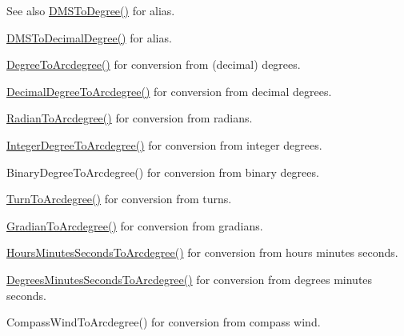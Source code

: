 \begin{DoxySeeAlso}{See also}
\mbox{\hyperlink{group___e_g_x_math-_angle_conversions-_d_m_s_ga3744d5ef737f693a191efc151d8ef3f3}{D\+M\+S\+To\+Degree()}} for alias. 

\mbox{\hyperlink{group___e_g_x_math-_angle_conversions-_d_m_s_ga10e325fbb65f6e2e7d8cd7d3d8af2931}{D\+M\+S\+To\+Decimal\+Degree()}} for alias. 

\mbox{\hyperlink{group___e_g_x_math-_angle_conversions-_degree_gac1b5f3b68f66c77a6df4ceef842c9b19}{Degree\+To\+Arcdegree()}} for conversion from (decimal) degrees. 

\mbox{\hyperlink{group___e_g_x_math-_angle_conversions-_decimal_degree_gacdd463fcabffeb598ebda65b012ce743}{Decimal\+Degree\+To\+Arcdegree()}} for conversion from decimal degrees. 

\mbox{\hyperlink{group___e_g_x_math-_angle_conversions-_radian_ga3dfdc97357cc07f8379976bbc08f9852}{Radian\+To\+Arcdegree()}} for conversion from radians. 

\mbox{\hyperlink{group___e_g_x_math-_angle_conversions-_integer_degree_gaf633d0b82bfb7586ce86ffbcf78d8f7a}{Integer\+Degree\+To\+Arcdegree()}} for conversion from integer degrees. 

Binary\+Degree\+To\+Arcdegree() for conversion from binary degrees. 

\mbox{\hyperlink{group___e_g_x_math-_angle_conversions-_turn_ga7bdc3a81ce316dd47b1a3179489fa195}{Turn\+To\+Arcdegree()}} for conversion from turns. 

\mbox{\hyperlink{group___e_g_x_math-_angle_conversions-_gradian_gacd0b1797f2460944dcbc541a855ec21c}{Gradian\+To\+Arcdegree()}} for conversion from gradians. 

\mbox{\hyperlink{group___e_g_x_math-_angle_conversions-_hours_minutes_seconds_ga3c38143df47da88534ddbd13726748e2}{Hours\+Minutes\+Seconds\+To\+Arcdegree()}} for conversion from hours minutes seconds. 

\mbox{\hyperlink{group___e_g_x_math-_angle_conversions-_degrees_minutes_seconds_ga71fd0a3b9238a3a4fde150802938dee8}{Degrees\+Minutes\+Seconds\+To\+Arcdegree()}} for conversion from degrees minutes seconds. 

Compass\+Wind\+To\+Arcdegree() for conversion from compass wind. 
\end{DoxySeeAlso}
\mbox{\label{group___e_g_x_math-_angle_conversions-_d_m_s_gab0fa9a734b22ff812a83a7784280d6db}} 
